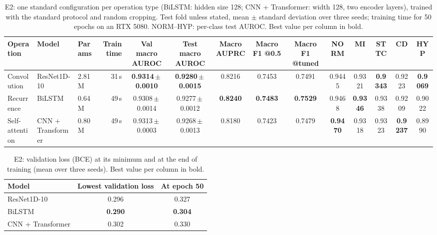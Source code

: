 \documentclass{article}
\begin{document}
\begin{table}[htb]
  \caption{E2: one standard configuration per operation type (BiLSTM: hidden size 128; CNN + Transformer: width 128, two encoder layers), trained with the standard protocol and random cropping. Test fold unless stated, mean $\pm$ standard deviation over three seeds; training time for 50 epochs on an RTX 5080. NORM--HYP: per-class test AUROC. Best value per column in bold.}
  \label{tab:e2}
  \centering\footnotesize
  \begin{adjustbox}{max width=\linewidth}
  \begin{tabular}{lllrcccccccccc}
    \toprule
    Operation & Model & Params & Train time & Val macro AUROC & Test macro AUROC & Macro AUPRC & Macro F1 @0.5 & Macro F1 @tuned & NORM & MI & STTC & CD & HYP \\
    \midrule
    Convolution & ResNet1D-10 & 2.81M & 31\,s & \textbf{0.9314\,$\pm$\,0.0010} & \textbf{0.9280\,$\pm$\,0.0015} & 0.8216 & 0.7453 & 0.7491 & 0.9445 & 0.9321 & \textbf{0.9343} & 0.9223 & \textbf{0.9069} \\
    Recurrence & BiLSTM & 0.64M & 49\,s & 0.9308\,$\pm$\,0.0014 & 0.9277\,$\pm$\,0.0012 & \textbf{0.8240} & \textbf{0.7483} & \textbf{0.7529} & 0.9468 & \textbf{0.9346} & 0.9338 & 0.9209 & 0.9022 \\
    Self-attention & CNN + Transformer & 0.80M & 49\,s & 0.9313\,$\pm$\,0.0003 & 0.9268\,$\pm$\,0.0013 & 0.8180 & 0.7423 & 0.7479 & \textbf{0.9470} & 0.9318 & 0.9323 & \textbf{0.9237} & 0.8990 \\
    \bottomrule
  \end{tabular}
  \end{adjustbox}
\end{table}

\begin{table}[htb]
  \caption{E2: validation loss (BCE) at its minimum and at the end of training (mean over three seeds). Best value per column in bold.}
  \label{tab:e2loss}
  \centering\small
  \begin{adjustbox}{max width=\linewidth}
  \begin{tabular}{lcc}
    \toprule
    Model & Lowest validation loss & At epoch 50 \\
    \midrule
    ResNet1D-10 & 0.296 & 0.327 \\
    BiLSTM & \textbf{0.290} & \textbf{0.304} \\
    CNN + Transformer & 0.302 & 0.330 \\
    \bottomrule
  \end{tabular}
  \end{adjustbox}
\end{table}
\end{document}
